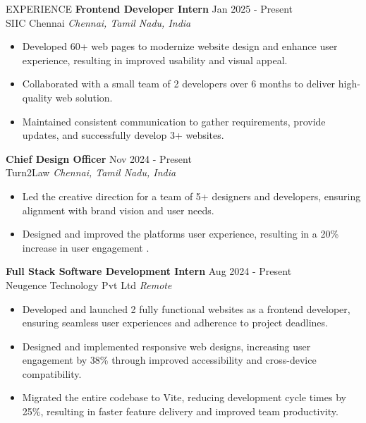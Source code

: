 \documentclass{resume} %
\begin{document}






\begin{rSection}{EXPERIENCE}
    \textbf{Frontend Developer Intern} \hfill Jan 2025 - Present\\
SIIC Chennai \hfill \textit{Chennai, Tamil Nadu, India}


\begin{itemize}
\itemsep -3pt{}
\item Developed 60+ web pages to modernize website design and enhance user experience, resulting in improved usability and visual appeal.
\item Collaborated with a small team of 2 developers over 6 months to deliver high-quality web solution.
\item Maintained consistent communication to gather requirements, provide updates, and successfully develop 3+ websites.
\end{itemize}
\textbf{Chief Design Officer} \hfill Nov 2024 - Present\\
Turn2Law \hfill \textit{Chennai, Tamil Nadu, India}


\begin{itemize}
\itemsep -3pt{}
\item Led the creative direction for a team of 5+ designers and developers, ensuring alignment with brand vision and user needs.
\item Designed and improved the platforms user experience, resulting in a 20\% increase in user engagement .
\end{itemize}
\textbf{Full Stack Software Development Intern} \hfill Aug 2024 - Present\\
Neugence Technology Pvt Ltd \hfill \textit{Remote}


\begin{itemize}
\itemsep -3pt{}
\item Developed and launched 2 fully functional websites as a frontend developer, ensuring seamless user experiences and adherence to project deadlines.
\item Designed and implemented responsive web designs, increasing user engagement by 38\% through improved accessibility and cross-device compatibility.
\item Migrated the entire codebase to Vite, reducing development cycle times by 25\%, resulting in faster feature delivery and improved team productivity.
\end{itemize}

\end{rSection}
\end{document}
